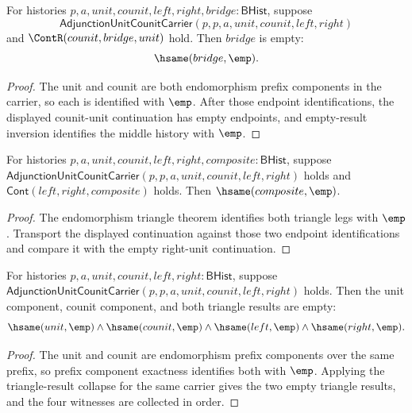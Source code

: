 \begin{theorem}
\label{thm:monad-adjunction-endomorphism-middle-between-counit-unit-empty}
For histories $p,a,unit,counit,left,right,bridge:\mathsf{BHist}$, suppose
$$
\mathsf{AdjunctionUnitCounitCarrier}(p,p,a,unit,counit,left,right)
$$
and $\ContR(counit,bridge,unit)$ hold. Then $bridge$ is empty:
$$
\hsame(bridge,\emp).
$$
\end{theorem}
\begin{proof}
The unit and counit are both endomorphism prefix components in the carrier, so
each is identified with $\emp$. After those endpoint identifications, the
displayed counit-unit continuation has empty endpoints, and empty-result
inversion identifies the middle history with $\emp$.
\end{proof}

\begin{theorem}
\label{thm:monad-adjunction-endomorphism-triangle-composite-empty}
For histories $p,a,unit,counit,left,right,composite:\mathsf{BHist}$, suppose
$\mathsf{AdjunctionUnitCounitCarrier}(p,p,a,unit,counit,left,right)$ holds and
$\mathsf{Cont}(left,right,composite)$ holds. Then
$\hsame(composite,\emp)$.
\end{theorem}
\begin{proof}
The endomorphism triangle theorem identifies both triangle legs with $\emp$.
Transport the displayed continuation against those two endpoint identifications
and compare it with the empty right-unit continuation.
\end{proof}

\begin{theorem}
\label{thm:monad-adjunction-endomorphism-unit-counit-triangle-empty}
For histories $p,a,unit,counit,left,right:\mathsf{BHist}$, suppose
$\mathsf{AdjunctionUnitCounitCarrier}(p,p,a,unit,counit,left,right)$ holds.
Then the unit component, counit component, and both triangle results are empty:
$$
\hsame(unit,\emp)\land\hsame(counit,\emp)\land
\hsame(left,\emp)\land\hsame(right,\emp).
$$
\end{theorem}
\begin{proof}
The unit and counit are endomorphism prefix components over the same prefix,
so prefix component exactness identifies both with $\emp$. Applying the
triangle-result collapse for the same carrier gives the two empty triangle
  results, and the four witnesses are collected in order.
\end{proof}

